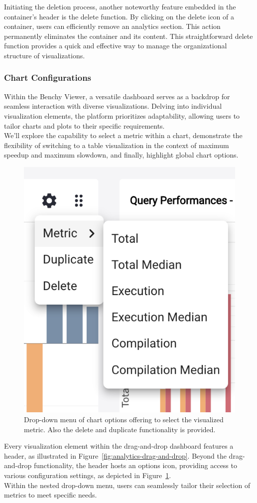 Initiating the deletion process, another noteworthy feature embedded in the container's header is the delete function. By clicking on the delete icon of a container, users can efficiently remove an analytics section. This action permanently eliminates the container and its content. This straightforward delete function provides a quick and effective way to manage the organizational structure of visualizations.


\subsubsection{Chart Configurations}\label{sec:chart-configuration}

Within the Benchy Viewer, a versatile dashboard serves as a backdrop for seamless interaction with diverse visualizations. Delving into individual visualization elements, the platform prioritizes adaptability, allowing users to tailor charts and plots to their specific requirements.\\
We'll explore the capability to select a metric within a chart, demonstrate the flexibility of switching to a table visualization in the context of maximum speedup and maximum slowdown, and finally, highlight global chart options.

\begin{figure}[h]
  \centering
  \includegraphics[width=0.35\linewidth]{figures/chart-configuration.png}
  \caption{Drop-down menu of chart options offering to select the visualized metric. Also the delete and duplicate functionality is provided.}
  \label{fig:chart-configuration}
\end{figure}

Every visualization element within the drag-and-drop dashboard features a header, as illustrated in Figure~\ref{fig:analytics-drag-and-drop}. Beyond the drag-and-drop functionality, the header hosts an options icon, providing access to various configuration settings, as depicted in Figure~\ref{fig:chart-configuration}.\\
Within the nested drop-down menu, users can seamlessly tailor their selection of metrics to meet specific needs.

